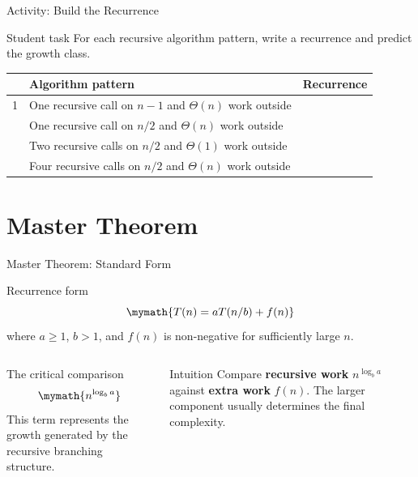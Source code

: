 \documentclass[aspectratio=169]{beamer}
\begin{document}
\begin{frame}{Activity: Build the Recurrence}
  \small
  \begin{block}{Student task}
    For each recursive algorithm pattern, write a recurrence and predict the growth class.
  \end{block}
  \begin{center}
    \renewcommand{\arraystretch}{1.25}
    \begin{tabular}{c|L{0.48\textwidth}|L{0.25\textwidth}}
      \toprule
      & \textbf{Algorithm pattern} & \textbf{Recurrence} \\
       & One recursive call on $n-1$ and $\Theta(n)$ work outside & \\
       & One recursive call on $n/2$ and $\Theta(n)$ work outside & \\
       & Two recursive calls on $n/2$ and $\Theta(1)$ work outside & \\
       & Four recursive calls on $n/2$ and $\Theta(n)$ work outside & \\
      \bottomrule
    \end{tabular}
  \end{center}
\end{frame}

\section{Master Theorem}

\begin{frame}{Master Theorem: Standard Form}
  \small
  \begin{block}{Recurrence form}
    \[
      \mymath{T(n)=aT(n/b)+f(n)}
    \]
    where $a\ge 1$, $b>1$, and $f(n)$ is non-negative for sufficiently large $n$.
  \end{block}
  \vspace{-0.2em}
  \begin{columns}[T]
    \begin{column}{0.48\textwidth}
      \begin{exampleblock}{The critical comparison}
        \[
          \mymath{n^{\log_b a}}
        \]
        This term represents the growth generated by the recursive branching structure.
      \end{exampleblock}
    \end{column}
    \begin{column}{0.48\textwidth}
      \begin{alertblock}{Intuition}
        Compare \textbf{recursive work} $n^{\log_b a}$ against \textbf{extra work} $f(n)$.
        The larger component usually determines the final complexity.
      \end{alertblock}
    \end{column}
  \end{columns}
\end{frame}
\end{document}
